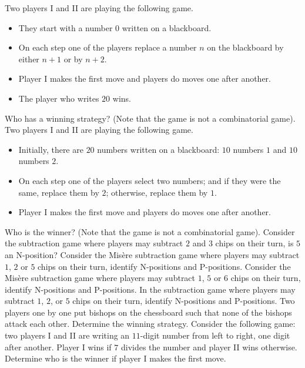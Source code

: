 \begin{chapterendexercises}
  \exercise
    Two players I and II are playing the following game.
    \begin{itemize}
      \item They start with a number $0$ written on a blackboard.
      \item On each step one of the players replace a number $n$ on the
        blackboard by either $n + 1$ or by $n + 2$.
      \item Player I makes the first move and players do moves one
        after another.
      \item The player who writes $20$ wins.
    \end{itemize}
    Who has a winning strategy?
    (Note that the game is not a combinatorial game).
  \exercise
    Two players I and II are playing the following game.
    \begin{itemize}
      \item Initially, there are $20$ numbers written on a blackboard:
        $10$ numbers $1$ and $10$ numbers $2$.
      \item On each step one of the players select two numbers;
        and if they were the same, replace them by $2$;
        otherwise, replace them by $1$.
      \item Player I makes the first move and players do moves one
        after another.
    \end{itemize}
    Who is the winner? (Note that the game is not a combinatorial game).
  \exercise Consider the subtraction game where players may subtract $2$ and $3$
    chips on their turn, is $5$ an N-position?
  \exercise Consider the Mis\`ere subtraction game where players may subtract
    $1$, $2$ or $5$ chips on their turn, identify N-positions and
    P-positions.
  \exercise Consider the Mis\`ere subtraction game where players may subtract
    $1$, $5$ or $6$ chips on their turn, identify N-positions and
    P-positions.
  \exercise
    In the subtraction game where players may subtract $1$, $2$, or $5$ chips
    on their turn, identify N-positions and P-positions.
  \exercise Two players one by one put bishops on the chessboard such that none
    of the bishops attack each other. Determine the winning strategy.
  \exercise Consider the following game: two players I and II are writing an
    $11$-digit number from left to right, one digit after another. Player I
    wins  if $7$ divides the number and player II wins otherwise.
    Determine who is the winner if player I makes the first move.
\end{chapterendexercises}
